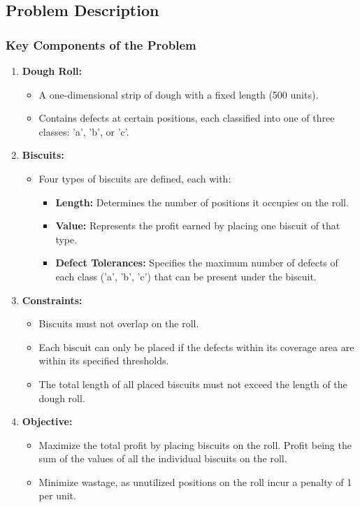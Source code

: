 \documentclass{modeleRapport}
\begin{document}
\subsection{Problem Description}

\subsubsection{Key Components of the Problem}

\begin{enumerate}
    \item \textbf{Dough Roll:}
    \begin{itemize}
        \item A one-dimensional strip of dough with a fixed length (500 units).
        \item Contains defects at certain positions, each classified into one of three classes: 'a', 'b', or 'c'.
    \end{itemize}

    \item \textbf{Biscuits:}
    \begin{itemize}
        \item Four types of biscuits are defined, each with:
        \begin{itemize}
            \item \textbf{Length:} Determines the number of positions it occupies on the roll.
            \item \textbf{Value:} Represents the profit earned by placing one biscuit of that type.
            \item \textbf{Defect Tolerances:} Specifies the maximum number of defects of each class ('a', 'b', 'c') 
            that can be present under the biscuit.
        \end{itemize}
    \end{itemize}
    
    \item \textbf{Constraints:}
    \begin{itemize}
        \item Biscuits must not overlap on the roll.
        \item Each biscuit can only be placed if the defects within its coverage area are within its specified thresholds.
        \item The total length of all placed biscuits must not exceed the length of the dough roll.
    \end{itemize}

    \item \textbf{Objective:}
    \begin{itemize}
        \item Maximize the total profit by placing biscuits on the roll. Profit being the sum of the values of all 
        the individual biscuits on the roll.
        \item Minimize wastage, as unutilized positions on the roll incur a penalty of 1 per unit.
    \end{itemize}
\end{enumerate}
\end{document}
